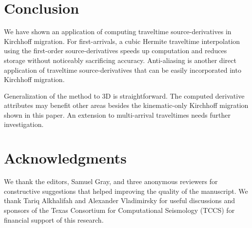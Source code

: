 \section{Conclusion}

We have shown an application of computing traveltime source-derivatives in Kirchhoff migration. For 
first-arrivals, a cubic Hermite traveltime interpolation using the first-order source-derivatives 
speeds up computation and reduces storage without noticeably sacrificing accuracy. Anti-aliasing is 
another direct application of traveltime source-derivatives that can be easily incorporated into 
Kirchhoff migration.

Generalization of the method to 3D is straightforward. The computed derivative attributes may 
benefit other areas besides the kinematic-only Kirchhoff migration shown in this paper. An extension 
to multi-arrival traveltimes needs further investigation.

\section{Acknowledgments}

We thank the editors, Samuel Gray, and three anonymous reviewers for constructive 
suggestions that helped improving the quality of the manuscript. We thank Tariq Alkhalifah and 
Alexander Vladimirsky for useful discussions and sponsors of the Texas Consortium for Computational 
Seismology (TCCS) for financial support of this research. 


